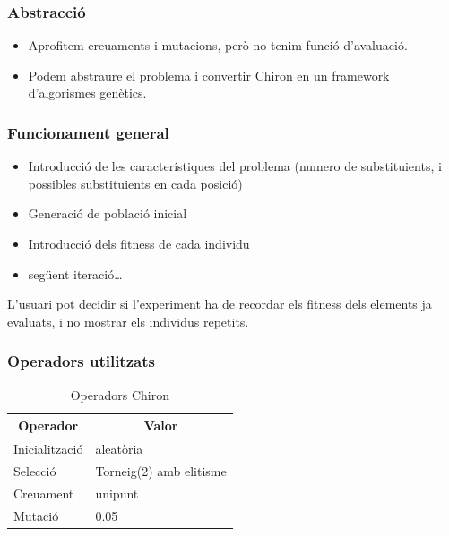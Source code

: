 \documentclass{beamer}
\begin{document}
\begin{frame}
	\frametitle{Abstracció}
	\begin{itemize}
	\item Aprofitem creuaments i mutacions, però no tenim funció d'avaluació.
	\pause
	\item Podem abstraure el problema i convertir Chiron en un framework
	d'algorismes genètics.
	\end{itemize}
\end{frame}

\begin{frame}
\frametitle{Funcionament general}
\begin{itemize}
\item Introducció de les característiques del problema (numero de substituients,
i possibles substituients en cada posició)
\item Generació de població inicial
\item Introducció dels fitness de cada individu
\item següent iteració\ldots
\end{itemize}
\pause
L'usuari pot decidir si l'experiment ha de recordar els fitness dels elements ja
evaluats, i no mostrar els individus repetits.
\end{frame}

\begin{frame}
\frametitle{Operadors utilitzats}


\begin{table}
\centering
\begin{tabular}{|l|l|}
\hline
\multicolumn{1}{|c|}{\textbf{Operador }} & \multicolumn{1}{c|}{\textbf{ Valor}} \\
\hline
\hline
Inicialització & aleatòria \\
Selecció       &  Torneig(2) amb elitisme       \\
Creuament       & unipunt  \\
Mutació        & 0.05        \\
\hline
\end{tabular}
\caption{Operadors Chiron}
\end{table}
\end{frame}
\end{document}
